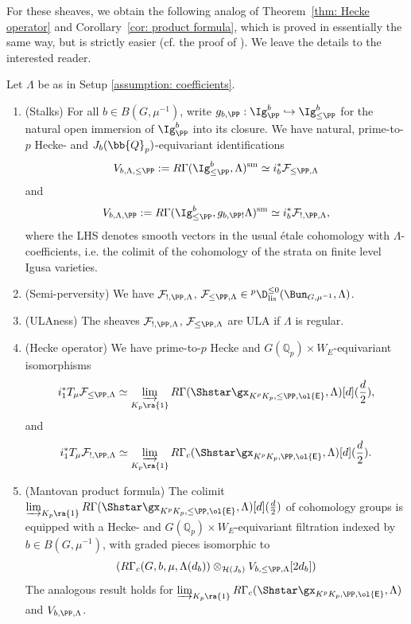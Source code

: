 \documentclass[letterpaper,11pt]{amsart}
\begin{document}
\noindent For these sheaves, we obtain the following analog of Theorem~\ref{thm: Hecke operator} and Corollary~\ref{cor: product formula}, which is proved in essentially the same way, but is strictly easier (cf. the proof of \cite[Proposition~3.6]{HamannLeeTorsion}). We leave the details to the interested reader.  

\begin{theorem}\label{thm: product formula boundary}\leavevmode
Let $\Lambda$ be as in Setup \ref{assumption: coefficients}.
\begin{enumerate}

\item (Stalks) For all $b \in B(G,\mu^{-1})$, write $g_{b,\PP}: \Ig^{b}_{\PP} \hookrightarrow \Ig^{b}_{\leq \PP}$ for the natural open immersion of $\Ig^{b}_{\PP}$ into its closure. We have natural, prime-to-$p$ Hecke- and $J_{b}(\bb{Q}_{p})$-equivariant identifications
\[ V_{b,\Lambda,\leq\PP}:= R\Gamma(\Ig^{b}_{\leq \PP},\Lambda)^{\mathrm{sm}} \simeq i_{b}^{*}\mathcal{F}_{\leq \PP,\Lambda} 
\]
and
\[
V_{b,\Lambda, \PP}:=R\Gamma(\Ig^{b}_{\leq\PP},g_{b, \PP!}\Lambda)^{\mathrm{sm}} \simeq i_{b}^{*}\mathcal{F}_{!,\PP,\Lambda}, \]
where the LHS denotes smooth vectors in the usual \'etale cohomology with $\Lambda$-coefficients, i.e. the colimit of the cohomology of the strata on finite level Igusa varieties.
\item (Semi-perversity) We have $\mathcal{F}_{!,\PP,\Lambda}$, $\mathcal{F}_{\leq \PP,\Lambda} \in \phantom{}^{p}\D_{\mathrm{lis}}^{\leq 0}(\Bun_{G,\mu^{-1}},\Lambda)$. 
\item (ULAness) The sheaves $\mathcal{F}_{!,\PP,\Lambda}$, $\mathcal{F}_{\leq \PP,\Lambda}$ are ULA if $\Lambda$ is regular.
\item (Hecke operator) We have prime-to-$p$ Hecke and $G(\mathbb{Q}_p)\times W_E$-equivariant isomorphisms
\[ 
i_{1}^{*}T_{\mu}\mathcal{F}_{\leq \PP,\Lambda} \simeq \varinjlim_{K_{p} \ra \{1\}} R\Gamma(\Shstar\gx_{K^{p}K_{p},\leq \PP,\ol{\mathsf{E}}},\Lambda)[d](\frac{d}{2}), 
\]
and 
\[ 
i_{1}^{*}T_{\mu}\mathcal{F}_{!,\PP,\Lambda} \simeq \varinjlim_{K_{p} \ra \{1\}} R\Gamma_{c}(\Shstar\gx_{K^{p}K_{p},\PP,\ol{\mathsf{E}}},\Lambda)[d](\frac{d}{2}). 
\]

\item (Mantovan product formula) The colimit $\varinjlim_{K_{p} \ra \{1\}} R\Gamma(\Shstar\gx_{K^{p}K_{p},\leq \PP,\ol{\mathsf{E}}},\Lambda)[d](\frac{d}{2})$ of cohomology groups is equipped with a Hecke- and $G(\mathbb{Q}_p)\times W_E$-equivariant filtration indexed by $b\in B(G,\mu^{-1})$, with graded pieces isomorphic to 
\[
 (R\Gamma_{c}(G,b,\mu, \Lambda(d_{b}))  \otimes_{\mathcal{H}(J_{b})} V_{b,\leq \PP,\Lambda}[2d_{b}])
\]
The analogous result holds for $\varinjlim_{K_{p} \ra \{1\}} R\Gamma_{c}(\Shstar\gx_{K^{p}K_{p},\PP,\ol{\mathsf{E}}},\Lambda)$ and $V_{b,\PP,\Lambda}$. 
\end{enumerate}
\end{theorem}
\end{document}
